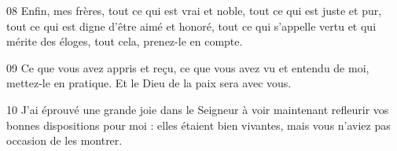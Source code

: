 
08 Enfin, mes frères, tout ce qui est vrai et noble, tout ce qui est juste et pur, tout ce qui est digne d’être aimé et honoré, tout ce qui s’appelle vertu et qui mérite des éloges, tout cela, prenez-le en compte.

09 Ce que vous avez appris et reçu, ce que vous avez vu et entendu de moi, mettez-le en pratique. Et le Dieu de la paix sera avec vous.

10 J’ai éprouvé une grande joie dans le Seigneur à voir maintenant refleurir vos bonnes dispositions pour moi : elles étaient bien vivantes, mais vous n’aviez pas occasion de les montrer.